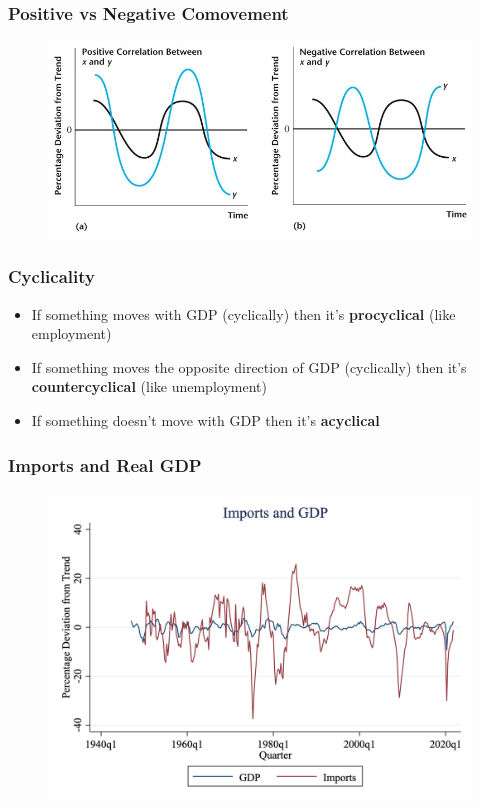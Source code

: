 \documentclass{beamer}
\begin{document}
\begin{frame}
\frametitle[alignment=center]{Positive vs Negative Comovement}
\begin{figure}
\centering
\includegraphics[scale=0.5]{Figures/W_Fig_3pt3.png}
\end{figure}
\end{frame}

\begin{frame}
\frametitle[alignment=center]{Cyclicality}
\begin{itemize}
\item If something moves with GDP (cyclically) then it's \textbf{procyclical} (like employment)
\item If something moves the opposite direction of GDP (cyclically) then it's \textbf{countercyclical} (like unemployment)
\item If something doesn't move with GDP then it's \textbf{acyclical} 
\end{itemize}
\end{frame}


\begin{frame}
\frametitle[alignment=center]{Imports and Real GDP}
\begin{figure}
\centering
\includegraphics[scale=0.25]{Figures/Fig_3pt5.png}
\end{figure}
\end{frame}
\end{document}
